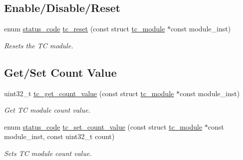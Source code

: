 \subsection*{Enable/\+Disable/\+Reset}
\begin{DoxyCompactItemize}
\item 
enum \mbox{\hyperlink{group__group__sam0__utils__status__codes_ga751c892e5a46b8e7d282085a5a5bf151}{status\+\_\+code}} \mbox{\hyperlink{group__asfdoc__sam0__tc__group_gad147c1f0393a3ae0c830cec73986eddd}{tc\+\_\+reset}} (const struct \mbox{\hyperlink{structtc__module}{tc\+\_\+module}} $\ast$const module\+\_\+inst)
\begin{DoxyCompactList}\small\item\em Resets the TC module. \end{DoxyCompactList}\end{DoxyCompactItemize}
\subsection*{Get/\+Set Count Value}
\begin{DoxyCompactItemize}
\item 
uint32\+\_\+t \mbox{\hyperlink{group__asfdoc__sam0__tc__group_gae7d7eb91616c2dff02886dd8cdc87f2d}{tc\+\_\+get\+\_\+count\+\_\+value}} (const struct \mbox{\hyperlink{structtc__module}{tc\+\_\+module}} $\ast$const module\+\_\+inst)
\begin{DoxyCompactList}\small\item\em Get TC module count value. \end{DoxyCompactList}\item 
enum \mbox{\hyperlink{group__group__sam0__utils__status__codes_ga751c892e5a46b8e7d282085a5a5bf151}{status\+\_\+code}} \mbox{\hyperlink{group__asfdoc__sam0__tc__group_ga9c81066b0b88893e127fa521f0efde2e}{tc\+\_\+set\+\_\+count\+\_\+value}} (const struct \mbox{\hyperlink{structtc__module}{tc\+\_\+module}} $\ast$const module\+\_\+inst, const uint32\+\_\+t count)
\begin{DoxyCompactList}\small\item\em Sets TC module count value. \end{DoxyCompactList}\end{DoxyCompactItemize}
